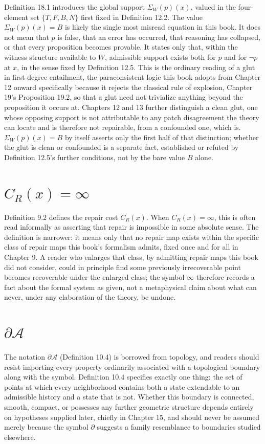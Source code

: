 \documentclass[11pt]{book}
\begin{document}
Definition 18.1 introduces the global support $\Sigma_W(p)(x)$, valued in the four-element set $\{T,F,B,N\}$ first fixed in Definition 12.2. The value $\Sigma_W(p)(x) = B$ is likely the single most misread equation in this book. It does not mean that $p$ is false, that an error has occurred, that reasoning has collapsed, or that every proposition becomes provable. It states only that, within the witness structure available to $W$, admissible support exists both for $p$ and for $\neg p$ at $x$, in the sense fixed by Definition 12.5. This is the ordinary reading of a glut in first-degree entailment, the paraconsistent logic this book adopts from Chapter 12 onward specifically because it rejects the classical rule of explosion, Chapter 19's Proposition 19.2, so that a glut need not trivialize anything beyond the proposition it occurs at. Chapters 12 and 13 further distinguish a clean glut, one whose opposing support is not attributable to any patch disagreement the theory can locate and is therefore not repairable, from a confounded one, which is. $\Sigma_W(p)(x) = B$ by itself asserts only the first half of that distinction; whether the glut is clean or confounded is a separate fact, established or refuted by Definition 12.5's further conditions, not by the bare value $B$ alone.

\section*{$C_R(x) = \infty$}

Definition 9.2 defines the repair cost $C_R(x)$. When $C_R(x) = \infty$, this is often read informally as asserting that repair is impossible in some absolute sense. The definition is narrower: it means only that no repair map exists within the specific class of repair maps this book's formalism admits, fixed once and for all in Chapter 9. A reader who enlarges that class, by admitting repair maps this book did not consider, could in principle find some previously irrecoverable point becomes recoverable under the enlarged class; the symbol $\infty$ therefore records a fact about the formal system as given, not a metaphysical claim about what can never, under any elaboration of the theory, be undone.

\section*{$\partial \mathcal A$}

The notation $\partial \mathcal A$ (Definition 10.4) is borrowed from topology, and readers should resist importing every property ordinarily associated with a topological boundary along with the symbol. Definition 10.4 specifies exactly one thing: the set of points at which every neighborhood contains both a state extendable to an admissible history and a state that is not. Whether this boundary is connected, smooth, compact, or possesses any further geometric structure depends entirely on hypotheses supplied later, chiefly in Chapter 15, and should never be assumed merely because the symbol $\partial$ suggests a family resemblance to boundaries studied elsewhere.
\end{document}
